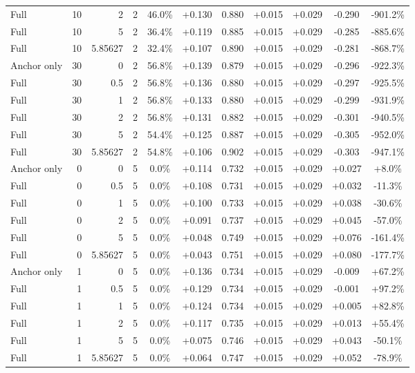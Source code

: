 \begin{table}[htbp]
\begin{tabular}{lrrrccccccc}
Full & 10 & 2 & 2 & 46.0\% & +0.130 & 0.880 & +0.015 & +0.029 & -0.290 & -901.2\% \\
Full & 10 & 5 & 2 & 36.4\% & +0.119 & 0.885 & +0.015 & +0.029 & -0.285 & -885.6\% \\
Full & 10 & 5.85627 & 2 & 32.4\% & +0.107 & 0.890 & +0.015 & +0.029 & -0.281 & -868.7\% \\
Anchor only & 30 & 0 & 2 & 56.8\% & +0.139 & 0.879 & +0.015 & +0.029 & -0.296 & -922.3\% \\
Full & 30 & 0.5 & 2 & 56.8\% & +0.136 & 0.880 & +0.015 & +0.029 & -0.297 & -925.5\% \\
Full & 30 & 1 & 2 & 56.8\% & +0.133 & 0.880 & +0.015 & +0.029 & -0.299 & -931.9\% \\
Full & 30 & 2 & 2 & 56.8\% & +0.131 & 0.882 & +0.015 & +0.029 & -0.301 & -940.5\% \\
Full & 30 & 5 & 2 & 54.4\% & +0.125 & 0.887 & +0.015 & +0.029 & -0.305 & -952.0\% \\
Full & 30 & 5.85627 & 2 & 54.8\% & +0.106 & 0.902 & +0.015 & +0.029 & -0.303 & -947.1\% \\
Anchor only & 0 & 0 & 5 & 0.0\% & +0.114 & 0.732 & +0.015 & +0.029 & +0.027 & +8.0\% \\
Full & 0 & 0.5 & 5 & 0.0\% & +0.108 & 0.731 & +0.015 & +0.029 & +0.032 & -11.3\% \\
Full & 0 & 1 & 5 & 0.0\% & +0.100 & 0.733 & +0.015 & +0.029 & +0.038 & -30.6\% \\
Full & 0 & 2 & 5 & 0.0\% & +0.091 & 0.737 & +0.015 & +0.029 & +0.045 & -57.0\% \\
Full & 0 & 5 & 5 & 0.0\% & +0.048 & 0.749 & +0.015 & +0.029 & +0.076 & -161.4\% \\
Full & 0 & 5.85627 & 5 & 0.0\% & +0.043 & 0.751 & +0.015 & +0.029 & +0.080 & -177.7\% \\
Anchor only & 1 & 0 & 5 & 0.0\% & +0.136 & 0.734 & +0.015 & +0.029 & -0.009 & +67.2\% \\
Full & 1 & 0.5 & 5 & 0.0\% & +0.129 & 0.734 & +0.015 & +0.029 & -0.001 & +97.2\% \\
Full & 1 & 1 & 5 & 0.0\% & +0.124 & 0.734 & +0.015 & +0.029 & +0.005 & +82.8\% \\
Full & 1 & 2 & 5 & 0.0\% & +0.117 & 0.735 & +0.015 & +0.029 & +0.013 & +55.4\% \\
Full & 1 & 5 & 5 & 0.0\% & +0.075 & 0.746 & +0.015 & +0.029 & +0.043 & -50.1\% \\
Full & 1 & 5.85627 & 5 & 0.0\% & +0.064 & 0.747 & +0.015 & +0.029 & +0.052 & -78.9\% \\

\end{tabular}
\end{table}
